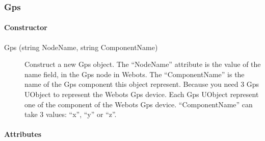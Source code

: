\subsubsection{Gps}
\label{webots.uobjects.robotdevices.gps}%

\paragraph{Constructor}
\label{webots.uobjects.robotdevices.gps.constructor}%

\noindent
\begin{description}
\item[{Gps (string NodeName, string ComponentName)}] Construct a new
  Gps object.  The ``NodeName'' attribute is the value of the name
  field, in the Gps node in Webots.  The ``ComponentName'' is the name
  of the Gps component this object represent.  Because you need 3 Gps
  UObject to represent the Webots Gps device. Each Gps UObject
  represent one of the component of the Webots Gps device.
  ``ComponentName'' can take 3 values: ``x'', ``y'' or ``z''.

\end{description}

\paragraph{Attributes}
\label{webots.uobjects.robotdevices.gps.attributes}%

